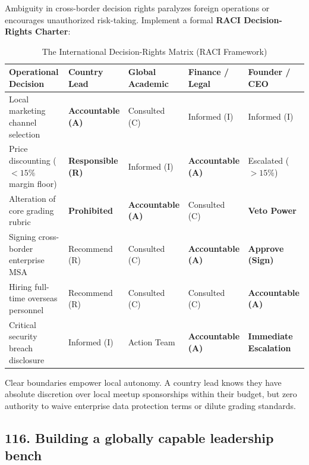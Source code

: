 Ambiguity in cross-border decision rights paralyzes foreign operations or encourages unauthorized risk-taking. Implement a formal \textbf{RACI Decision-Rights Charter}:

\begin{table}[t]
\centering
\small
\caption{The International Decision-Rights Matrix (RACI Framework)}
\label{tab:raci_matrix}
\begin{tabularx}{\textwidth}{p{4.2cm} p{2.2cm} p{2.8cm} p{2.4cm} X}
\toprule
\textbf{Operational Decision} & \textbf{Country Lead} & \textbf{Global Academic} & \textbf{Finance / Legal} & \textbf{Founder / CEO} \\
\midrule
Local marketing channel selection & \textbf{Accountable (A)} & Consulted (C) & Informed (I) & Informed (I) \\
Price discounting ($<15\%$ margin floor) & \textbf{Responsible (R)} & Informed (I) & \textbf{Accountable (A)} & Escalated ($>15\%$) \\
Alteration of core grading rubric & \textbf{Prohibited} & \textbf{Accountable (A)} & Consulted (C) & \textbf{Veto Power} \\
Signing cross-border enterprise MSA & Recommend (R) & Consulted (C) & \textbf{Accountable (A)} & \textbf{Approve (Sign)} \\
Hiring full-time overseas personnel & Recommend (R) & Consulted (C) & Consulted (C) & \textbf{Accountable (A)} \\
Critical security breach disclosure & Informed (I) & Action Team & \textbf{Accountable (A)} & \textbf{Immediate Escalation} \\
\bottomrule
\end{tabularx}
\end{table}

Clear boundaries empower local autonomy. A country lead knows they have absolute discretion over local meetup sponsorships within their budget, but zero authority to waive enterprise data protection terms or dilute grading standards.

\subsection{116. Building a globally capable leadership bench}


